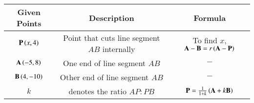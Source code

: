 \begin{tabular}[12pt]{ |c| c| c|}
    \hline
    \textbf{Given Points} & \textbf{Description} & \textbf{Formula}\\ 
    \hline
    $\mathbf{P}\left(x,4\right)$ & Point that cuts line segment $AB$ internally & To find $x$, $\mathbf{A}-\mathbf{B}=r\left(\mathbf{A}-\mathbf{P}\right)$ \\
    \hline 
    $\mathbf{A}\left(-5,8\right)$ & One end of line segment $AB$ & $-$\\
    \hline
    $\mathbf{B}\left(4,-10\right)$ & Other end of line segment $AB$ & $-$\\
    \hline 
    $k$ & denotes the ratio $AP:PB$ & $\mathbf{P}=\frac{1}{1+k}\left(\mathbf{A}+k\mathbf{B}\right)$ \\
    \hline
    \end{tabular}
